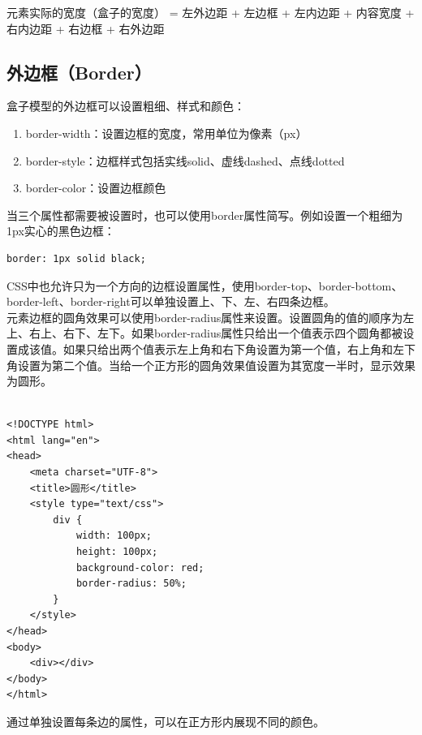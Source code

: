 元素实际的宽度（盒子的宽度） = 左外边距 + 左边框 + 左内边距 + 内容宽度 + 右内边距 + 右边框 + 右外边距\\

\subsection{外边框（Border）}

盒子模型的外边框可以设置粗细、样式和颜色：

\begin{enumerate}
	\item border-width：设置边框的宽度，常用单位为像素（px）
	\item border-style：边框样式包括实线solid、虚线dashed、点线dotted
	\item border-color：设置边框颜色
\end{enumerate}

当三个属性都需要被设置时，也可以使用border属性简写。例如设置一个粗细为1px实心的黑色边框：\\

\begin{lstlisting}[style=htmlcssjs]
border: 1px solid black;
\end{lstlisting}

CSS中也允许只为一个方向的边框设置属性，使用border-top、border-bottom、border-left、border-right可以单独设置上、下、左、右四条边框。\\

元素边框的圆角效果可以使用border-radius属性来设置。设置圆角的值的顺序为左上、右上、右下、左下。如果border-radius属性只给出一个值表示四个圆角都被设置成该值。如果只给出两个值表示左上角和右下角设置为第一个值，右上角和左下角设置为第二个值。当给一个正方形的圆角效果值设置为其宽度一半时，显示效果为圆形。\\

\\

\begin{lstlisting}[style=htmlcssjs]
<!DOCTYPE html>
<html lang="en">
<head>
    <meta charset="UTF-8">
    <title>圆形</title>
    <style type="text/css">
        div {
            width: 100px;
            height: 100px;
            background-color: red;
            border-radius: 50%;
        }
    </style>
</head>
<body>
    <div></div>
</body>
</html>
\end{lstlisting}

通过单独设置每条边的属性，可以在正方形内展现不同的颜色。

\begin{figure}[H]
	\centering
\end{figure}

